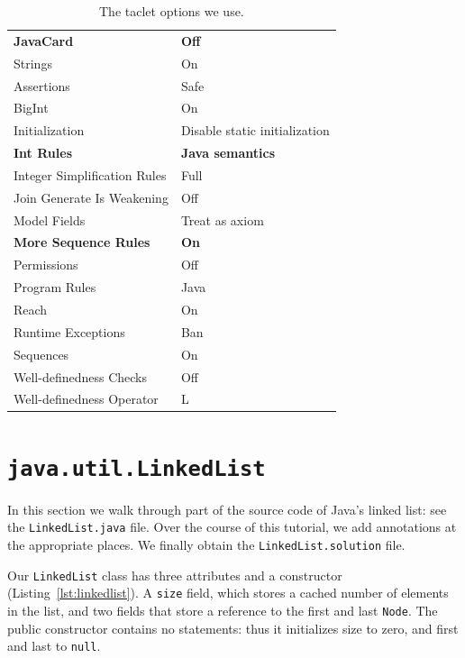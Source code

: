 \documentclass[runningheads]{llncs}
\begin{document}
\begin{table}
    \begin{tabular}{l@{\hskip6pt}|@{\hskip6pt}l}
    \textbf{JavaCard} & \textbf{Off} \\
    Strings & On \\
    Assertions & Safe \\
    BigInt & On \\
    Initialization & Disable static initialization \\
    \textbf{Int Rules} & \textbf{Java semantics} \\
    Integer Simplification Rules & Full \\
    Join Generate Is Weakening & Off \\
    Model Fields & Treat as axiom \\
    \textbf{More Sequence Rules} & \textbf{On} \\
    Permissions & Off \\
    Program Rules & Java \\
    Reach & On \\
    Runtime Exceptions & Ban \\
    Sequences & On \\
    Well-definedness Checks & Off \\
    Well-definedness Operator & L
    \end{tabular}
    \medskip
    \caption{The taclet options we use.}
    \vspace*{-20pt}
    \label{tab:taclet-options}
\end{table}

\section{\texttt{java.util.LinkedList}}\label{sec:linkedlist}

In this section we walk through part of the source code of Java's linked list: see the \texttt{LinkedList.java} file. Over the course of this tutorial, we add annotations at the appropriate places. We finally obtain the \texttt{LinkedList.solution} file.



Our \texttt{LinkedList} class has three attributes and a constructor (Listing~\ref{lst:linkedlist}). A \texttt{size} field, which stores a cached number of elements in the list, and two fields that store a reference to the first and last \texttt{Node}. The public constructor contains no statements: thus it initializes size to zero, and first and last to \texttt{null}.
\end{document}
